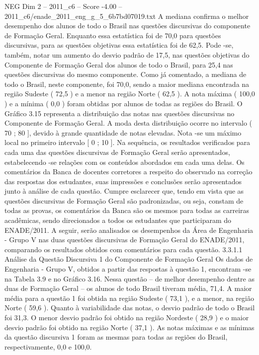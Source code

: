 \begin{textsample}{NEG Dim 2 – 2011\_c6 – Score -4.00 – 2011\_c6/enade\_2011\_eng\_g\_5\_6b7bd07019.txt}
A mediana confirma o melhor desempenho dos alunos de todo o Brasil nas questões discursivas do componente de Formação Geral.
Enquanto essa estatística foi de 70,0 para questões discursivas, para as questões objetivas essa estatística foi de 62,5.
Pode -se, também, notar um aumento do desvio padrão de 17,5, nas questões objetivas do Componente de Formação Geral dos alunos de todo o Brasil, para 25,4 nas questões discursivas do mesmo componente.
Como já comentado, a mediana de todo o Brasil, neste componente, foi 70,0, sendo a maior mediana encontrada na região Sudeste ( 72,5 ) e a menor na região Norte ( 62,5 ).
A nota máxima ( 100,0 ) e a mínima ( 0,0 ) foram obtidas por alunos de todas as regiões do Brasil.
O Gráfico 3.15 representa a distribuição das notas nas questões discursivas no Componente de Formação Geral.
A moda desta distribuição ocorre no intervalo ( 70 ; 80 ], devido à grande quantidade de notas elevadas.
Nota -se um máximo local no primeiro intervalo [ 0 ; 10 ].
Na sequência, os resultados verificados para cada uma das questões discursivas de Formação Geral serão apresentados, estabelecendo -se relações com os conteúdos abordados em cada uma delas.
Os comentários da Banca de docentes corretores a respeito do observado na correção das respostas dos estudantes, suas impressões e conclusões serão apresentados junto à análise de cada questão.
Cumpre esclarecer que, tendo em vista que as questões discursivas de Formação Geral são padronizadas, ou seja, constam de todas as provas, os comentários da Banca são os mesmos para todas as carreiras acadêmicas, sendo direcionados a todos os estudantes que participaram do ENADE/2011.
A seguir, serão analisados os desempenhos da Área de Engenharia - Grupo V nas duas questões discursivas de Formação Geral do ENADE/2011, comparando os resultados obtidos com comentários para cada questão. 3.3.1.1 Análise da Questão Discursiva 1 do Componente de Formação Geral Os dados de Engenharia - Grupo V, obtidos a partir das respostas à questão 1, encontram -se na Tabela 3.9 e no Gráfico 3.16.
Nessa questão – de melhor desempenho dentre as duas de Formação Geral – os alunos de todo Brasil tiveram média, 71,4.
A maior média para a questão 1 foi obtida na região Sudeste ( 73,1 ), e a menor, na região Norte ( 59,6 ).
Quanto à variabilidade das notas, o desvio padrão de todo o Brasil foi 31,3.
O menor desvio padrão foi obtido na região Nordeste ( 28,9 ) e o maior desvio padrão foi obtido na região Norte ( 37,1 ).
As notas máximas e as mínimas da questão discursiva 1 foram as mesmas para todas as regiões do Brasil, respectivamente, 0,0 e 100,0.

\end{textsample}
